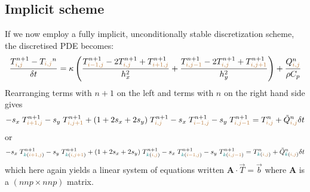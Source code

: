 \subsection{Implicit scheme} 
If we now employ a fully implicit, unconditionally stable discretization scheme, the discretised 
PDE becomes:
\begin{equation}
\frac{T_{{\color{brown}i},{\color{brown}j}}^{n+1}-T_{\color{brown}i,j}^n}{\delta t}
= \kappa
\left(
\frac{ T_{{\color{brown}i-1,j}}^{n+1}-2T_{{\color{brown}i,j}}^{n+1}+T_{{\color{brown}i+1,j}}^{n+1} }{h_x^2} + 
\frac{ T_{{\color{brown}i,j-1}}^{n+1}-2T_{{\color{brown}i,j}}^{n+1}+T_{{\color{brown}i,j+1}}^{n+1} }{h_y^2}
\right)
+\frac{Q_{{\color{brown}i,j}}^n}{\rho C_p}
\end{equation}
Rearranging terms with $n+1$ on the left and terms with $n$ on the right hand side gives
\begin{equation}
-s_x\; T_{{\color{brown}i+1,j}}^{n+1}
-s_y\; T_{{\color{brown}i,j+1}}^{n+1} 
+(1+2s_x+2s_y)\; T_{{\color{brown}i,j}}^{n+1} 
-s_x\;  T_{{\color{brown}i-1,j}}^{n+1} 
-s_y\;  T_{{\color{brown}i,j-1}}^{n+1} 
=
T_{{\color{brown}i,j}}^n
+\tilde{Q}_{{\color{brown}i,j}}^n \delta t
\end{equation}
or
\begin{equation}
-s_x\;           T_{{\color{teal}k}({\color{brown}i+1,j})}^{n+1}
-s_y\;           T_{{\color{teal}k}({\color{brown}i,j+1})}^{n+1} 
+(1+2s_x+2s_y)\; T_{{\color{teal}k}({\color{brown}i,j}  )}^{n+1} 
-s_x\;           T_{{\color{teal}k}({\color{brown}i-1,j})}^{n+1} 
-s_y\;           T_{{\color{teal}k}({\color{brown}i,j-1})}^{n+1} 
=
T_{{\color{teal}k}({\color{brown}i,j})}^n
+\tilde{Q}_{{\color{teal}k}({\color{brown}i,j})}^n \delta t
\end{equation}
which here again yields a linear system of equations written ${\bm A}\cdot {\vec T} = {\vec b}$
where ${\bm A}$ is a $(nnp \times nnp)$ matrix.


